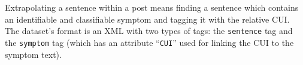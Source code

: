 Extrapolating a sentence within a post means finding a sentence which contains an identifiable and classifiable symptom and tagging it with the relative CUI. The dataset's format is an XML with two types of tags: the \texttt{sentence} tag and the \texttt{symptom} tag (which has an attribute ``\texttt{CUI}'' used for linking the CUI to the symptom text).
